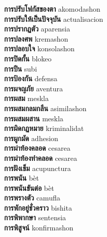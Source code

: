 \textbf{ การปรับโฟกัสของตา  } akomodashon \\
\textbf{ การปรับให้เป็นปัจจุบัน  } actualisacion \\
\textbf{ การปรากฏตัว  } aparensia \\
\textbf{ การปลงศพ  } kremashon \\
\textbf{ การปลอบใจ  } konsolashon \\
\textbf{ การปิดกั้น  } blokeo \\
\textbf{ การปีน  } subi \\
\textbf{ การป้องกัน  } defensa \\
\textbf{ การผจญภัย  } aventura \\
\textbf{ การผสม  } meskla \\
\textbf{ การผสมกลมกลืน  } asimilashon \\
\textbf{ การผสมผสาน  } meskla \\
\textbf{ การผิดกฏหมาย  } kriminalidat \\
\textbf{ การผูกมัด  } adhesion \\
\textbf{ การผ่าท้องคลอด  } cesarea \\
\textbf{ การผ่าท้องทำคลอด  } cesarea \\
\textbf{ การฝังเข็ม  } acupunctura \\
\textbf{ การพนัน  } bèt \\
\textbf{ การพนันขันต่อ  } bèt \\
\textbf{ การพรางตัว  } camufla \\
\textbf{ การพักอยู่ชั่วคราว  } bishita \\
\textbf{ การพิพากษา  } sentensia \\
\textbf{ การพิสูจน์  } konfirmashon \\
